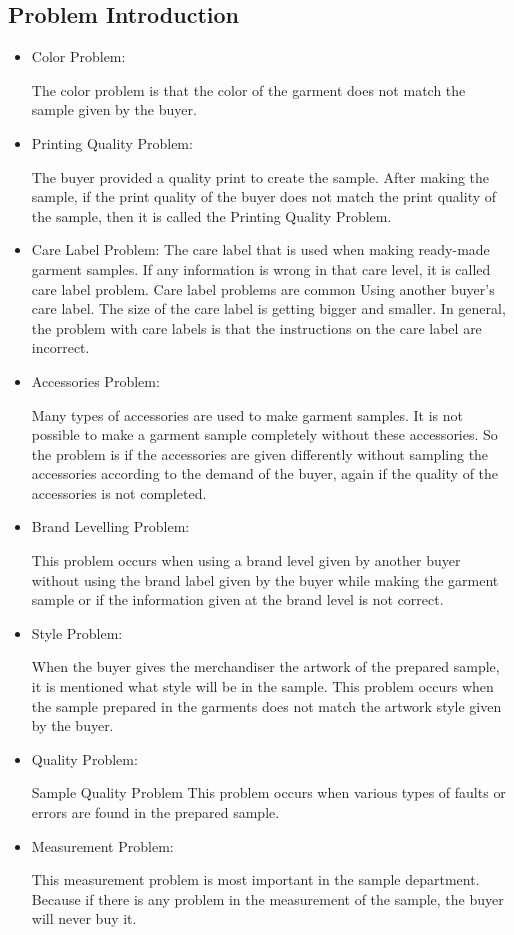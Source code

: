 \documentclass{article}
\begin{document}
\subsection{Problem Introduction}
\begin{itemize}
    \item Color Problem:
    
     The color problem is that the color of the garment does not match the sample given by the buyer.
     \item Printing Quality Problem:

    The buyer provided a quality print to create the sample. After making the sample, if the print quality of the buyer does not match the print quality of the sample, then it is called the Printing Quality Problem.\\
    \item Care Label Problem:
    The care label that is used when making ready-made garment samples. If any information is wrong in that care level, it is called care label problem.
Care label problems are common
Using another buyer's care label.
The size of the care label is getting bigger and smaller.
In general, the problem with care labels is that the instructions on the care label are incorrect.
\item Accessories Problem:

Many types of accessories are used to make garment samples. It is not possible to make a garment sample completely without these accessories.
So the problem is if the accessories are given differently without sampling the accessories according to the demand of the buyer, again if the quality of the accessories is not completed.
\item Brand Levelling Problem:

This problem occurs when using a brand level given by another buyer without using the brand label given by the buyer while making the garment sample or if the information given at the brand level is not correct.
\item Style Problem:

When the buyer gives the merchandiser the artwork of the prepared sample, it is mentioned what style will be in the sample.
This problem occurs when the sample prepared in the garments does not match the artwork style given by the buyer.
 \item Quality Problem:

Sample Quality Problem This problem occurs when various types of faults or errors are found in the prepared sample.
\item Measurement Problem:

This measurement problem is most important in the sample department. Because if there is any problem in the measurement of the sample, the buyer will never buy it.

\end{itemize}
\newpage
\end{document}
